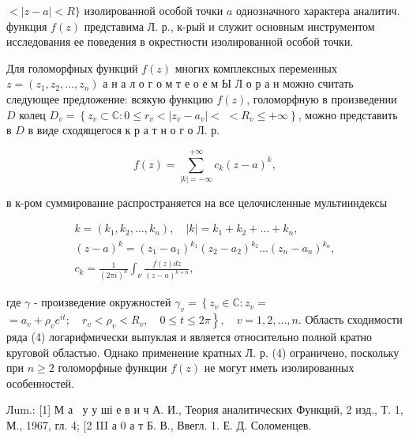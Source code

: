 \documentclass[10pt]{article}
\begin{document}
$<|z-a|<R\}$ изолированной особой точки $a$ однозначного характера аналитич. функция $f(z)$ представима Л. р., к-рый и служит основным инструментом исследования ее поведения в окрестности изолированной особой точки.



Для голоморфных функций $f(z)$ многих комплексных переменных $z=\left(z_{1}, z_{2}, \ldots, z_{n}\right)$ а н а л о г о м т е о е м Ы Л о р а н можно считать следующее предложение: всякую функцию $f(z)$, голоморфную в произведении $D$ колец $D_{v}=\left\{z_{v} \subset \mathbb{C}: 0 \leqslant r_{v}<\left|z_{v}-a_{v}\right|<\right.$ $\left.<R_{v} \leqslant+\infty\right\}$, можно представить в $D$ в виде сходящегося к р а т н о г о Л. р.



\[

f(z)=\sum_{|k|=-\infty}^{+\infty} c_{k}(z-a)^{k},

\]



в к-ром суммирование распространяется на все целочисленные мультииндексы



\[

\begin{gathered}

k=\left(k_{1}, k_{2}, \ldots, k_{n}\right), \quad|k|=k_{1}+k_{2}+\ldots+k_{n}, \\

(z-a)^{k}=\left(z_{1}-a_{1}\right)^{k_{1}}\left(z_{2}-a_{2}\right)^{k_{2}} \ldots\left(z_{n}-a_{n}\right)^{k_{n}}, \\

c_{k}=\frac{1}{(2 \pi i)^{n}} \int_{\nu} \frac{f(z) d z}{(z-a)^{k+n}},

\end{gathered}

\]



где $\gamma$ - произведение окружностей $\gamma_{v}=\left\{z_{v} \in \mathbb{C}: z_{v}=\right.$ $\left.=a_{v}+\rho_{v} e^{i t} ; \quad r_{v}<\rho_{v}<R_{v}, \quad 0 \leqslant t \leqslant 2 \pi\right\}, \quad v=1,2, \ldots, n$. Область сходимости ряда (4) логарифмически выпуклая и является относительно полной кратно круговой областью. Однако применение кратных Л. р. (4) ограничено, поскольку при $n \geqslant 2$ голоморфные функции $f(z)$ не могут иметь изолированных особенностей.



Лum.: [1] М а $\mathbf{~}$ у у ші е в и ч А. И., Теория аналитических Функций, 2 изд., Т. 1, М., 1967, гл. 4; [2 III а 0 а т Б. В., Ввегл. 1. Е. Д. Соломенцев.
\end{document}
